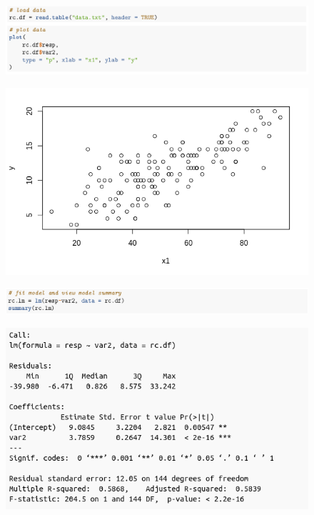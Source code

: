 \begin{figure}[H]
	\centering
	\includegraphics[width=\linewidth]{./images/s7fig4.png}
\end{figure}
\begin{figure}[H]
	\centering
	\includegraphics[width=12cm]{./images/s7fig5.png}
\end{figure}
\begin{figure}[H]
	\centering
	\includegraphics[width=\linewidth]{./images/s7fig6.png}
\end{figure}
\begin{figure}[H]
	\includegraphics[width=12cm]{./images/s7fig2.png}
\end{figure}
